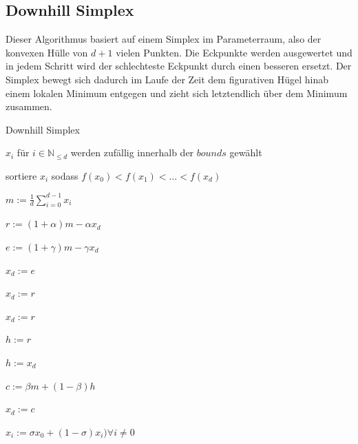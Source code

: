 \documentclass[a4paper,12pt]{article}
\begin{document}
\subsection{Downhill Simplex}

Dieser Algorithmus basiert auf einem Simplex im Parameterraum, also der konvexen Hülle von $d+1$ vielen Punkten. Die Eckpunkte werden ausgewertet und in jedem Schritt wird der schlechteste Eckpunkt durch einen besseren ersetzt. Der Simplex bewegt sich dadurch im Laufe der Zeit dem figurativen Hügel hinab einem lokalen Minimum entgegen und zieht sich letztendlich über dem Minimum zusammen.

\begin{algorithm}
\caption{Downhill Simplex}
\begin{algorithmic}

\State $x_i$ für $i \in \mathbb{N}_{\leq d}$ werden zufällig innerhalb der $bounds$ gewählt


\State sortiere $x_i$ sodass $f(x_0) < f(x_1) < \hdots < f(x_d)$

\State $m := \frac{1}{d} \sum^{d-1}_{i = 0} x_i$ 

\State $r := (1+\alpha)m - \alpha x_d$ 


\State $e := (1+\gamma)m - \gamma x_d$ 


\State $x_d := e$

\Else

\State $x_d := r$

\EndIf


\State $x_d := r$

\Else


\State $h := r$

\Else

\State $h := x_d$

\EndIf

\State $c := \beta m  + (1-\beta) h$

 

\State $x_d := c$

\Else

\State $x_i := \sigma x_0 + (1-\sigma) x_i) \forall i \neq 0$ 

\EndIf

\EndIf

\EndFor
\EndFunction	
\end{algorithmic}
\end{algorithm}
\end{document}
